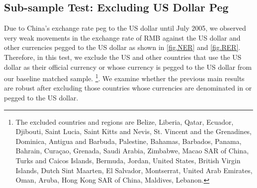 \documentclass[12pt]{article}
\begin{document}
\subsection{Sub-sample Test: Excluding US Dollar Peg}

Due to China's exchange rate peg to the US dollar until July 2005, we observed very weak movements in the exchange rate of RMB against the US dollar and other currencies pegged to the US dollar as shown in \ref{fig.NER} and \ref{fig.RER}. Therefore, in this test, we exclude the US and other countries that use the US dollar as their official currency or whose currency is pegged to the US dollar from our baseline matched sample. \footnote{The excluded countries and regions are Belize, Liberia, Qatar, Ecuador, Djibouti, Saint Lucia, Saint Kitts and Nevis, St. Vincent and the Grenadines, Dominica, Antigua and Barbuda, Palestine, Bahamas, Barbados, Panama, Bahrain, Curaçao, Grenada, Saudi Arabia, Zimbabwe, Macao SAR of China, Turks and Caicos Islands, Bermuda, Jordan, United States, British Virgin Islands, Dutch Sint Maarten, El Salvador, Montserrat, United Arab Emirates, Oman, Aruba, Hong Kong SAR of China, Maldives, Lebanon.}. We examine whether the previous main results are robust after excluding those countries whose currencies are denominated in or pegged to the US dollar.
\end{document}
